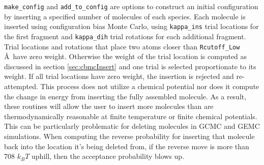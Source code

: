 {\tt make\_config} and {\tt add\_to\_config} are options to construct an initial configuration
by inserting a specified number of molecules of each species.
Each molecule is inserted using configuration bias Monte Carlo,
using {\tt kappa\_ins} trial locations for the first fragment and
{\tt kappa\_dih} trial rotations for each additional fragment.
Trial locations and rotations that place two atoms closer than {\tt Rcutoff\_Low} \AA\ have zero weight.
Otherwise the weight of the trial location is computed as discussed in section \ref{sec:cbmcInsert} and
one trial is selected proportionate to its weight.
If all trial locations have zero weight, the insertion is rejected and re-attempted.
This process does not utilize a chemical potential
nor does it compute the change in energy from inserting the fully assembled molecule.
As a result, these routines will allow the user to insert more molecules than
are thermodynamically reasonable at finite temperature or finite chemical potentials.
This can be particularly problematic for deleting molecules in GCMC and GEMC simulations.
When computing the reverse probability for inserting that molecule back into the location it's being deleted from,
if the reverse move is more than 708 $k_BT$ uphill, then the acceptance probability blows up. \\
%
